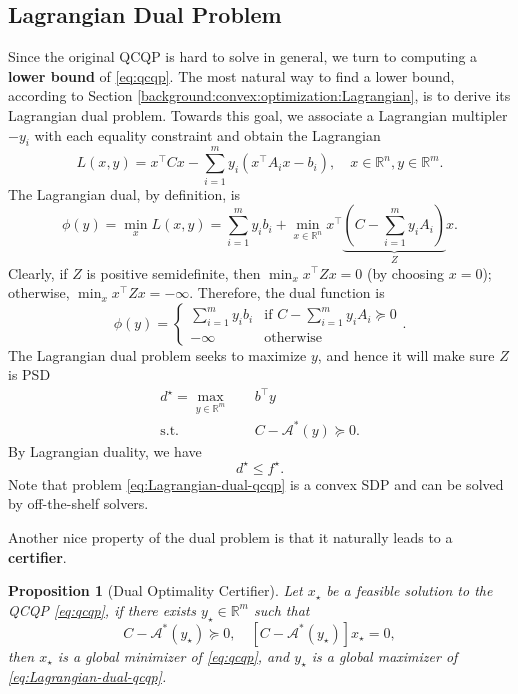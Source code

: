 \documentclass[
]{book}
\newtheorem{proposition}{Proposition}[chapter]
\theoremstyle{definition}
\theoremstyle{definition}
\theoremstyle{definition}
\theoremstyle{definition}
\theoremstyle{remark}
\begin{document}
\subsection{Lagrangian Dual Problem}\label{lagrangian-dual-problem}

Since the original QCQP is hard to solve in general, we turn to computing a \textbf{lower bound} of \eqref{eq:qcqp}. The most natural way to find a lower bound, according to Section \ref{background:convex:optimization:Lagrangian}, is to derive its Lagrangian dual problem. Towards this goal, we associate a Lagrangian multipler \(-y_i\) with each equality constraint and obtain the Lagrangian
\[
L(x,y) = x^\top C x - \sum_{i=1}^m y_i (x^\top A_i x - b_i), \quad x \in \mathbb{R}^{n},y \in \mathbb{R}^{m}.
\]
The Lagrangian dual, by definition, is
\[
\phi(y) = \min_x L(x,y) = \sum_{i=1}^m y_i b_i + \min_{x \in \mathbb{R}^{n}} x^\top\underbrace{\left( C - \sum_{i=1}^m y_i A_i \right)}_{Z} x.
\]
Clearly, if \(Z\) is positive semidefinite, then \(\min_x x^\top Z x = 0\) (by choosing \(x=0\)); otherwise, \(\min_x x^\top Z x = -\infty\). Therefore, the dual function is
\[
\phi(y) = \begin{cases}
\sum_{i=1}^m y_i b_i & \text{if } C - \sum_{i=1}^m y_i A_i \succeq 0 \\
- \infty & \text{otherwise}
\end{cases}.
\]
The Lagrangian dual problem seeks to maximize \(y\), and hence it will make sure \(Z\) is PSD
\begin{equation}
\begin{split}
d^\star = \max_{y \in \mathbb{R}^{m}} & \quad b^\top y \\
\mathrm{s.t.}& \quad C - \mathcal{A}^*(y) \succeq 0.
\end{split}
\label{eq:Lagrangian-dual-qcqp}
\end{equation}
By Lagrangian duality, we have
\[
d^\star \leq f^\star.
\]
Note that problem \eqref{eq:Lagrangian-dual-qcqp} is a convex SDP and can be solved by off-the-shelf solvers.

Another nice property of the dual problem is that it naturally leads to a \textbf{certifier}.

\begin{proposition}[Dual Optimality Certifier]
\protect\hypertarget{prp:DualCertifier}{}\label{prp:DualCertifier}Let \(x_\star\) be a feasible solution to the QCQP \eqref{eq:qcqp}, if there exists \(y_\star \in \mathbb{R}^{m}\) such that
\begin{equation}
C - \mathcal{A}^*(y_\star) \succeq 0, \quad [ C - \mathcal{A}^*(y_\star) ] x_\star = 0,
\label{eq:dual-optimality-condition}
\end{equation}
then \(x_\star\) is a global minimizer of \eqref{eq:qcqp}, and \(y_\star\) is a global maximizer of \eqref{eq:Lagrangian-dual-qcqp}.
\end{proposition}
\end{document}
